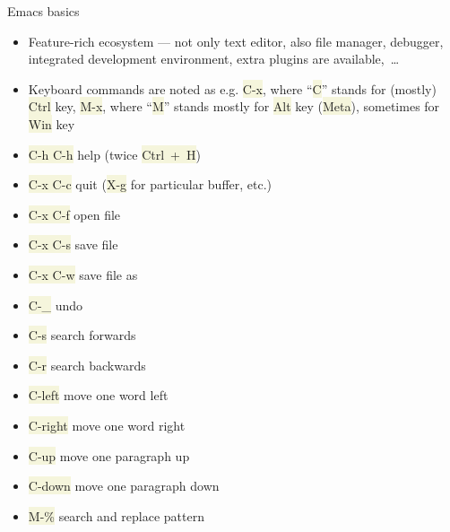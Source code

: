 \documentclass[compress, ucs, xelatex, 11pt, xcolor=svgnames, aspectratio=169,
	hyperref={
		bookmarks=true,
		unicode=true,
		colorlinks=true,
		pdftitle={Linux, command line and MetaCentrum},
		plainpages=false,
		pdfauthor={Vojtech Zeisek},
		pdfsubject={Course about use of Linux command line, writing shell scripts and using MetaCentrum of CESNET},
		pdfcreator={XeLaTeX},
		pdfkeywords={Linux, GNU, BASH, shell, command line, MetaCentrum},
		linkcolor=DarkRed, %
		anchorcolor=DarkBlue, %
		citecolor=Indigo, %
		filecolor=NavyBlue, %
		menucolor=DarkMagenta, %
		urlcolor=DarkBlue, %
		pdftex},
	url={hyphens, lowtilde} %
	]{beamer}
\renewcommand{\texttt}[1]{\colorbox{Beige}{{\ttfamily #1}}}
\begin{document}
\begin{frame}{Emacs basics}
	\begin{itemize}
		\item Feature-rich ecosystem --- not only text editor, also file manager, debugger, integrated development environment, extra plugins are available,~\ldots
		\item Keyboard commands are noted as e.g. \texttt{C-x}, where \enquote{\texttt{C}} stands for (mostly) \texttt{Ctrl} key, \texttt{M-x}, where \enquote{\texttt{M}} stands mostly for \texttt{Alt} key (\texttt{Meta}), sometimes for \texttt{Win} key
	\end{itemize}
	\begin{multicols}{2}
		\begin{itemize}
			\item \texttt{C-h C-h} help (twice \texttt{Ctrl~+~H})
			\item \texttt{C-x C-c} quit (\texttt{X-g} for particular buffer, etc.)
			\item \texttt{C-x C-f} open file
			\item \texttt{C-x C-s} save file
			\item \texttt{C-x C-w} save file as
			\item \texttt{C-\_} undo
			\item \texttt{C-s} search forwards
			\item \texttt{C-r} search backwards
			\item \texttt{C-left} move one word left
			\item \texttt{C-right} move one word right
			\item \texttt{C-up} move one paragraph up
			\item \texttt{C-down} move one paragraph down
			\item \texttt{M-\%} search and replace pattern
		\end{itemize}
	\end{multicols}
\end{frame}
\end{document}
